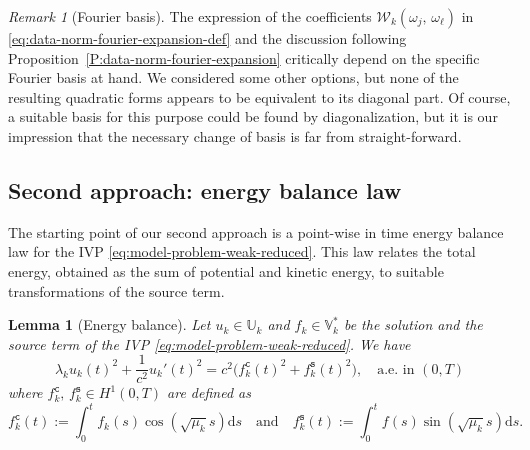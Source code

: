 \documentclass{amsart}
\theoremstyle{plain}
\newtheorem{lemma}[theorem]{Lemma}
\theoremstyle{remark}
\newtheorem{remark}[theorem]{Remark}
\numberwithin{equation}{section}
\numberwithin{theorem}{section}
\newcommand{\trial}{\mathbb{U}}
\newcommand{\data}{\mathbb{V}^*}
\newcommand{\fsin}{f_{k}^{\mathtt{s}}}
\newcommand{\fcos}{f_{k}^{\mathtt{c}}}
\begin{document}
\begin{remark}[Fourier basis]
\label{rem:fourier-basis}	
The expression of the coefficients $\mathcal{W}_{k}(\omega_j,\,\omega_\ell)$ in \eqref{eq:data-norm-fourier-expansion-def} and the discussion following Proposition~\ref{P:data-norm-fourier-expansion} critically depend on the specific Fourier basis at hand. We considered some other options, but none of the resulting quadratic forms appears to be equivalent to its diagonal part. Of course, a suitable basis for this purpose could be found by diagonalization, but it is our impression that the necessary change of basis is far from straight-forward.
\end{remark}

\subsection{Second  approach: energy balance law}  
\label{SS:energy-balance-law}
%
The starting point of our second approach is a point-wise in time energy balance law for the IVP \eqref{eq:model-problem-weak-reduced}. This law relates the total energy, obtained as the sum of potential and kinetic energy, to suitable transformations  of the source term. 

\begin{lemma}[Energy balance]
\label{L:energy-balance}
Let $u_{k} \in \trial_k$ and $f_k \in \data_k$ be the solution and the source term of the IVP \eqref{eq:model-problem-weak-reduced}. We have
\begin{equation}
\label{eq:energy-balance}
\lambda_k u_k(t)^2 + \frac{1}{c^2}u_k'(t)^2  = c^2\Big (\fcos(t)^2 + \fsin(t)^2 \Big ), \quad \text{a.e. in $(0,T)$}
\end{equation}
where $\fcos,\,\fsin \in H^1(0,T)$ are defined as
\begin{equation}
\label{eq:fcos-fsin}
\fcos(t)  := \int_0^t f_k(s)\cos{(\sqrt{\mu_k} s)} \mathrm{d}s  
\quad \text{and} \quad 
\fsin(t)  := \int_0^t f(s)\sin{(\sqrt{\mu_k} s)}\mathrm{d}s.
\end{equation}
\end{lemma}
\end{document}
